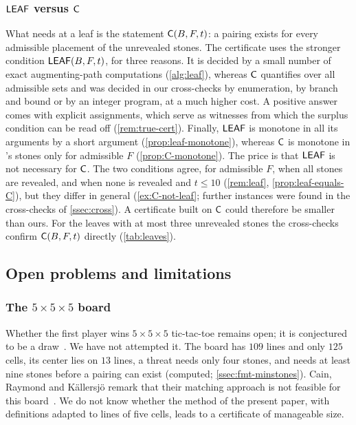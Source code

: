 \subsubsection*{$\mathsf{LEAF}$ versus $\mathsf{C}$}
What \Breaker{} needs at a leaf is the statement $\mathsf{C}(B,F,t)$: a pairing exists for every admissible
placement of the unrevealed stones. The certificate uses the stronger condition $\mathsf{LEAF}(B,F,t)$, for
three reasons. It is decided by a small number of exact augmenting-path computations
(\cref{alg:leaf}), whereas $\mathsf{C}$ quantifies over all admissible sets and was decided in our
cross-checks by enumeration, by branch and bound or by an integer program, at a much higher cost. A positive
answer comes with explicit assignments, which serve as witnesses from which the surplus condition can be
read off (\cref{rem:true-cert}). Finally, $\mathsf{LEAF}$ is monotone in all its arguments by a short argument
(\cref{prop:leaf-monotone}), whereas $\mathsf{C}$ is monotone in \Breaker's stones only for admissible $F$
(\cref{prop:C-monotone}). The price is that $\mathsf{LEAF}$ is not necessary for $\mathsf{C}$. The two conditions
agree, for admissible $F$, when all stones are revealed, and when none is revealed and $t\le 10$
(\cref{rem:leaf}, \cref{prop:leaf-equals-C}), but they differ in general (\cref{ex:C-not-leaf}; further
instances were found in the cross-checks of \cref{ssec:cross}). A certificate built on $\mathsf{C}$ could
therefore be smaller than ours. For the leaves with at most three unrevealed stones the cross-checks
confirm $\mathsf{C}(B,F,t)$ directly (\cref{tab:leaves}).

\subsection{Open problems and limitations}\label{ssec:open}

\subsubsection*{The \texorpdfstring{$5\times5\times5$}{5x5x5} board}
Whether the first player wins $5\times5\times5$ tic-tac-toe remains open; it is conjectured to be a
draw~\cite{Beck2008,GolombHales2002}. We have not attempted it. The board has $109$ lines and only
$125$ cells, its center lies on $13$ lines, a threat needs only four stones, and \Breaker{} needs at
least nine stones before a pairing can exist (computed; \cref{ssec:fmt-minstones}). Cain, Raymond and
K\"allersj\"o remark that their matching approach is not feasible for this
board~\cite{CainRaymondKallersjo2025}. We do not know whether the method of the present paper,
with definitions adapted to lines of five cells, leads to a certificate of manageable size.

